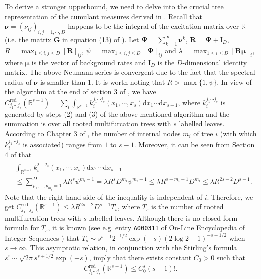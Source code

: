 \documentclass[11pt]{article}
\numberwithin{equation}{section}
\theoremstyle{plain}
\theoremstyle{definition}
\theoremstyle{definition}
\theoremstyle{assumption}
\theoremstyle{proposition}
\theoremstyle{proposition}
\theoremstyle{example}
\theoremstyle{lemma}
\theoremstyle{theorem}
\theoremstyle{remark}
\begin{document}
To derive a stronger upperbound, we need to delve into the crucial tree representation of the cumulant measures derived in \citet{Jovanovic_et_al2015}. Recall that $\boldsymbol{\nu} = (\nu_{ij})_{i,j=1,\cdots,D}$ happens to be the integral of the excitation matrix over $\mathbb{R}$ (i.e. the matrix $\mathbf{G}$ in equation (13) of \citet{Jovanovic_et_al2015}). Let $\boldsymbol{\Psi} = \sum_{k=1}^{\infty}\boldsymbol{\nu}^k$, $\mathbf{R} = \boldsymbol{\Psi} + \boldsymbol{\mathrm{I}}_{D}$, $R = \max_{1\leqslant i,j\leqslant D} [\mathbf{R}]_{ij}$, $\psi = \max_{1\leqslant i,j\leqslant D} [\boldsymbol{\Psi}]_{ij}$ and $\lambda = \max_{1\leqslant i\leqslant D}[\mathbf{R}\boldsymbol{\mu}]_{i}$, where $\boldsymbol{\mu}$ is the vector of background rates and $\boldsymbol{\mathrm{I}}_{D}$ is the $D$-dimensional identity matrix. The above Neumann series is convergent due to the fact that the spectral radius of $\boldsymbol{\nu}$ is smaller than 1. It is worth noting that $R > \max\{1, \psi\}$. In view of the algorithm at the end of section 3 of \citet{Jovanovic_et_al2015}, we have
$C_{j_1\cdots j_s}^{\mathrm{red}}(\mathbb{R}^{s-1}) = \sum_{i} \int_{\mathbb{R}^{s-1}}k_{i}^{j_1\cdots j_s}(x_1,\cdots,x_s)\mathrm{d}x_1\cdots\mathrm{d}x_{s-1}$, where $k_{i}^{j_1\cdots j_s}$ is generated by steps (2) and (3) of the above-mentioned algorithm and the summation is over all rooted multifurcation trees with $s$ labelled leaves. According to Chapter 3 of \citet{Felsenstein2004}, the number of internal nodes $m_i$ of tree $i$ (with which $k_{i}^{j_1\cdots j_s}$ is associated) ranges from $1$ to $s-1$. Moreover, it can be seen from Section 4 of \citet{Jovanovic_et_al2015} that
\begin{align*}
&\int_{\mathbb{R}^{s-1}}k_{i}^{j_1\cdots j_s}(x_1,\cdots,x_s)\mathrm{d}x_1\cdots\mathrm{d}x_{s-1} \\
&\leqslant \sum_{p_1,\cdots,p_{m_i}=1}^{D} \lambda R^s \psi^{m_i - 1} = \lambda R^s D^{m_i}\psi^{m_i - 1}
\leqslant \lambda R^{s + m_i - 1} D^{m_i}
\leqslant \lambda R^{2s - 2} D^{s-1} .
\end{align*}
Note that the right-hand side of the inequality is independent of $i$. Therefore, we get $C_{j_1\cdots j_s}^{\mathrm{red}}(\mathbb{R}^{s-1}) \leqslant \lambda R^{2s - 2} D^{s-1}T_{s}$, where $T_{s}$ is the number of rooted multifurcation trees with $s$ labelled leaves. Although there is no closed-form formula for $T_s$, it is known (see e.g. entry \texttt{A000311} of On-Line Encyclopedia of Integer Sequences \citep{oeis}) that $T_s \sim s^{s-1} 2^{-1/2}\exp(-s)(2\log 2 - 1)^{-s + 1/2}$ \citep{Kotesovec2014} when $s\rightarrow\infty$. This asymptotic relation, in conjunction with the Stirling's formula $s! \sim \sqrt{2\pi } s^{s+1/2} \exp(-s)$, imply that there exists constant $C_0 > 0$ such that
\begin{align*}
C_{j_1\cdots j_s}^{\mathrm{red}}(\mathbb{R}^{s-1})
  \leqslant C_0^s (s-1)!.
\end{align*}
\end{document}

